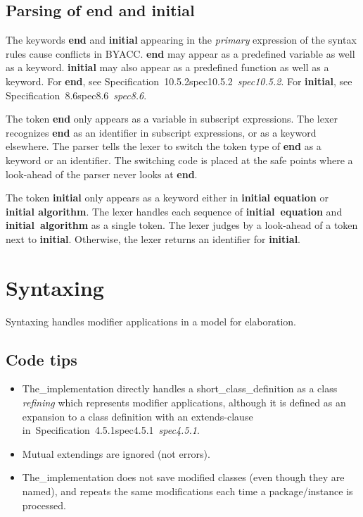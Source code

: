 \documentclass[10pt,b5paper]{article}
\def\specrefx#1#2{Specification~#1\ifx\relax#2\relax{}\else~{\it{}#2}\fi}
\def\specref#1{\specrefx{#1}{\csname spec#1\endcsname}}
\begin{document}

\subsection{Parsing of {\bf{}end} and {\bf{}initial}}

The keywords {\bf{}end} and {\bf{}initial} appearing in the
{\it{}primary\/} expression of the syntax rules cause conflicts in
BYACC\@.  {\bf{}end} may appear as a predefined variable as well as a
keyword.  {\bf{}initial} may also appear as a predefined function as
well as a keyword.  For {\bf{}end}, see \specref{10.5.2}.  For
{\bf{}initial}, see \specref{8.6}.

The token {\bf{}end} only appears as a variable in subscript
expressions.  The lexer recognizes {\bf{}end} as an identifier in
subscript expressions, or as a keyword elsewhere.  The parser tells
the lexer to switch the token type of {\bf{}end} as a keyword or an
identifier.  The switching code is placed at the safe points where a
look-ahead of the parser never looks at {\bf{}end}.

The token {\bf{}initial} only appears as a keyword either in
{\bf{}initial equation} or {\bf{}initial algorithm}.  The lexer
handles each sequence of {\bf{}initial~equation} and
{\bf{}initial~algorithm} as a single token.  The lexer judges by a
look-ahead of a token next to {\bf{}initial}.  Otherwise, the lexer
returns an identifier for {\bf{}initial}.


\section{Syntaxing}

Syntaxing handles modifier applications in a model for elaboration.


\subsection{Code tips}

\begin{itemize}

\item The_implementation directly handles a short_class_definition as
a class {\it{}refining\/} which represents modifier applications,
although it is defined as an expansion to a class definition with an
extends-clause in~\specref{4.5.1}.

\item Mutual extendings are ignored (not errors).

\item The_implementation does not save modified classes (even though
they are named), and repeats the same modifications each time a
package/instance is processed.


\end{itemize}
\end{document}
